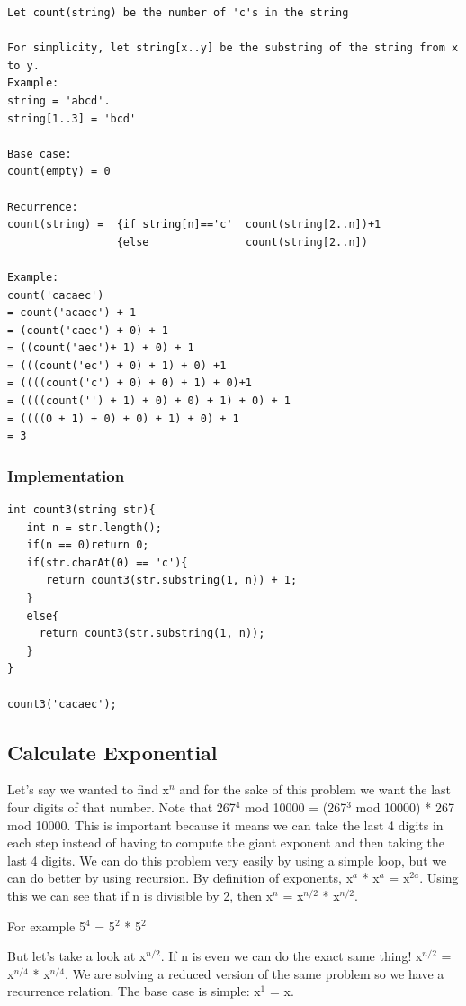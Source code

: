 \documentclass[11pt,oneside]{book}
\begin{document}
\begin{lstlisting}
Let count(string) be the number of 'c's in the string

For simplicity, let string[x..y] be the substring of the string from x to y.
Example: 
string = 'abcd'.
string[1..3] = 'bcd'

Base case:
count(empty) = 0

Recurrence:
count(string) =  {if string[n]=='c'  count(string[2..n])+1
                 {else               count(string[2..n])

Example:
count('cacaec')
= count('acaec') + 1
= (count('caec') + 0) + 1
= ((count('aec')+ 1) + 0) + 1
= (((count('ec') + 0) + 1) + 0) +1
= ((((count('c') + 0) + 0) + 1) + 0)+1
= ((((count('') + 1) + 0) + 0) + 1) + 0) + 1
= ((((0 + 1) + 0) + 0) + 1) + 0) + 1
= 3
\end{lstlisting}

\subsubsection{Implementation}

\begin{lstlisting}
int count3(string str){
   int n = str.length();
   if(n == 0)return 0;
   if(str.charAt(0) == 'c'){
      return count3(str.substring(1, n)) + 1;
   }
   else{
     return count3(str.substring(1, n));
   }
}

count3('cacaec');

\end{lstlisting}

\subsection{Calculate Exponential}

Let's say we wanted to find x$^{n}$ and for the sake of this problem we want the last four digits of that number. Note that 267$^{4}$ mod 10000 = (267$^{3}$ mod 10000) * 267 mod 10000. This is important because it means we can take the last 4 digits in each step instead of having to compute the giant exponent and then taking the last 4 digits. We can do this problem very easily by using a simple loop, but we can do better by using recursion. By definition of exponents, x$^{a}$ * x$^{a}$ = x$^{2a}$. Using this we can see that if n is divisible by 2, then x$^{n}$ = x$^{n/2}$ * x$^{n/2}$.

For example 5$^{4}$ = 5$^{2}$ * 5$^{2}$

But let's take a look at x$^{n/2}$. If n is even we can do the exact same thing! x$^{n/2}$ = x$^{n/4}$ * x$^{n/4}$. We are solving a reduced version of the same problem so we have a recurrence relation. The base case is simple: x$^{1}$ = x.
\end{document}
